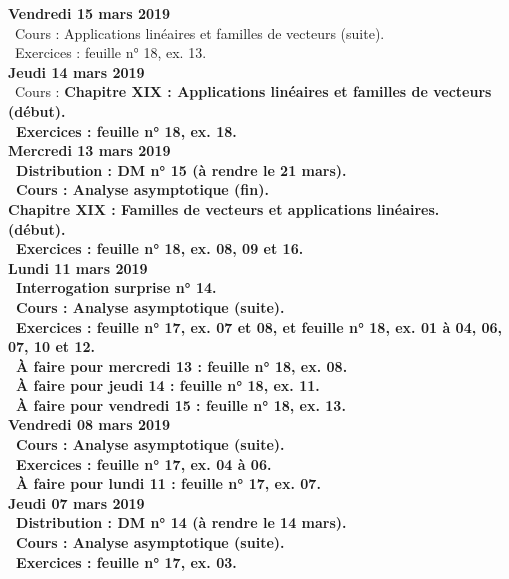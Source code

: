 \documentclass[12pt,a4paper]{article}
\begin{document}
\noindent\textbf{\bf Vendredi 15 mars 2019} \\
\bu\ Cours : Applications linéaires et familles de vecteurs (suite).\\
\bu\ Exercices : feuille n° 18, ex. 13.\vspace{.4cm}\\

\noindent\textbf{Jeudi 14 mars 2019}\\
\bu\ Cours : \bf Chapitre XIX \rm : Applications linéaires et familles de vecteurs (début).\\
\bu\ Exercices : feuille n° 18, ex. 18.\vspace{.4cm}\\

\noindent\textbf{Mercredi 13 mars 2019} \\
\bu\ Distribution : DM n° 15 (à rendre le 21 mars).\\
\bu\ Cours : Analyse asymptotique (fin).\\
\bf Chapitre XIX \rm : Familles de vecteurs et applications linéaires.\\ 
(début).\\
\bu\ Exercices : feuille n° 18, ex. 08, 09 et 16.\vspace{.4cm}\\

\noindent\textbf{\bf Lundi 11 mars 2019} \\
\bu\ Interrogation surprise n° 14.\\
\bu\ Cours : Analyse asymptotique (suite).\\
\bu\ Exercices : feuille n° 17, ex. 07 et 08, et feuille n° 18, ex. 01 à 04, 06, 07, 10 et 12.\\
\bu\ À faire pour mercredi 13 : feuille n° 18, ex. 08.\\
\bu\ À faire pour jeudi 14 : feuille n° 18, ex. 11.\\
\bu\ À faire pour vendredi 15 : feuille n° 18, ex. 13.\vspace{.4cm}\\

\noindent\textbf{\bf Vendredi 08 mars 2019} \\
\bu\ Cours : Analyse asymptotique (suite).\\
\bu\ Exercices : feuille n° 17, ex. 04 à 06.\\
\bu\ À faire pour lundi 11 : feuille n° 17, ex. 07.\vspace{.4cm}\\

\noindent\textbf{Jeudi 07 mars 2019}\\
\bu\ Distribution : DM n° 14 (à rendre le 14 mars).\\
\bu\ Cours : Analyse asymptotique (suite).\\
\bu\ Exercices : feuille n° 17, ex. 03.\vspace{.4cm}\\
\end{document}
